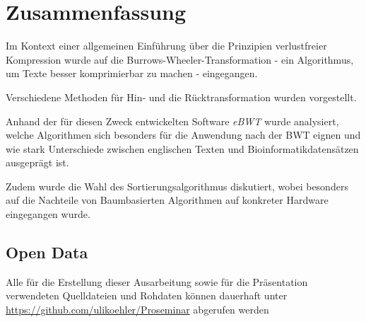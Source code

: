 \documentclass[ngerman,pdftex,paper=A4,DIV=calc,titlepage,12pt]{scrartcl}
\newtheorem[L]{boxedDefinition}{Definition}
\begin{document}
\section{Zusammenfassung}
Im Kontext einer allgemeinen Einführung über die Prinzipien verlustfreier Kompression wurde auf die Burrows-Wheeler-Transformation - ein Algorithmus, um Texte besser komprimierbar zu machen - eingegangen.

\noindent Verschiedene Methoden für Hin- und die Rücktransformation wurden vorgestellt. 

Anhand der für diesen Zweck entwickelten Software \textit{eBWT} wurde analysiert, welche Algorithmen sich besonders für die Anwendung nach der BWT eignen und wie stark Unterschiede zwischen englischen Texten und Bioinformatikdatensätzen ausgeprägt ist.

Zudem wurde die Wahl des Sortierungsalgorithmus diskutiert, wobei besonders auf die Nachteile von Baumbasierten Algorithmen auf konkreter Hardware eingegangen wurde.
\renewcommand\refname{Literatur- und Quellenverzeichnis}


\subsection*{Open Data}\label{opendata}
Alle für die Erstellung dieser Ausarbeitung sowie für die Präsentation verwendeten Quelldateien und Rohdaten können dauerhaft unter \url{https://github.com/ulikoehler/Proseminar} abgerufen werden
\end{document}
